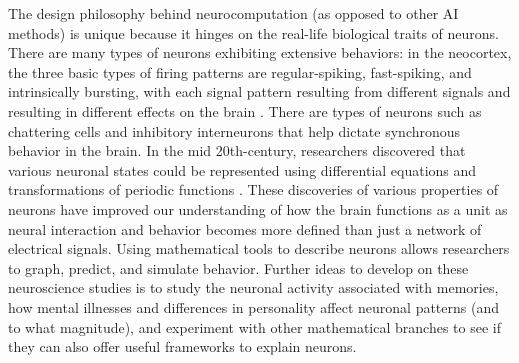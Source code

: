 \documentclass{sigchi}
\begin{document}
The design philosophy behind neurocomputation (as opposed to other AI methods) is unique because it hinges on the real-life biological traits of neurons. There are many types of neurons exhibiting extensive behaviors: in the neocortex, the three basic types of firing patterns are regular-spiking, fast-spiking, and intrinsically bursting, with each signal pattern resulting from different signals and resulting in different effects on the brain \cite{firingpatterns}. There are types of neurons such as chattering cells \cite{chattercells} and inhibitory interneurons \cite{twonetworks} that help dictate synchronous behavior in the brain. In the mid 20th-century, researchers discovered that various neuronal states could be represented using differential equations and transformations of periodic functions \cite{parabolicbursting, neuralexcite, hodgkinquantitative}. These discoveries of various properties of neurons have improved our understanding of how the brain functions as a unit as neural interaction and behavior becomes more defined than just a network of electrical signals. Using mathematical tools to describe neurons allows researchers to graph, predict, and simulate behavior. Further ideas to develop on these neuroscience studies is to study the neuronal activity associated with memories, how mental illnesses and differences in personality affect neuronal patterns (and to what magnitude), and experiment with other mathematical branches to see if they can also offer useful frameworks to explain neurons.
\end{document}
